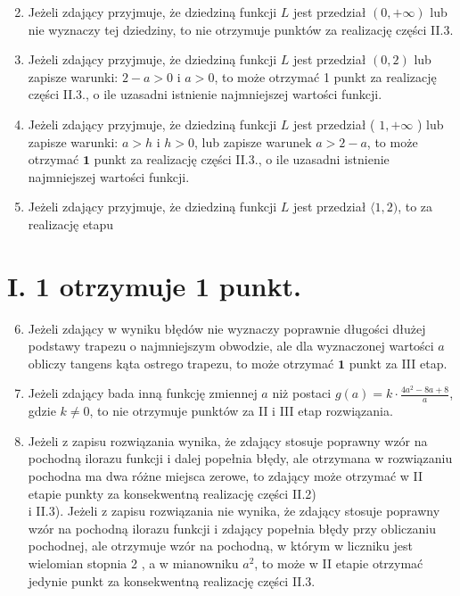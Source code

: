 \documentclass[10pt]{article}
\begin{document}
\begin{enumerate}
  \setcounter{enumi}{1}
  \item Jeżeli zdający przyjmuje, że dziedziną funkcji $L$ jest przedział $(0,+\infty)$ lub nie wyznaczy tej dziedziny, to nie otrzymuje punktów za realizację części II.3.
  \item Jeżeli zdający przyjmuje, że dziedziną funkcji $L$ jest przedział $(0,2)$ lub zapisze warunki: $2-a>0$ i $a>0$, to może otrzymać 1 punkt za realizację części II.3., o ile uzasadni istnienie najmniejszej wartości funkcji.
  \item Jeżeli zdający przyjmuje, że dziedziną funkcji $L$ jest przedział ( $1,+\infty$ ) lub zapisze warunki: $a>h$ i $h>0$, lub zapisze warunek $a>2-a$, to może otrzymać $\mathbf{1}$ punkt za realizację części II.3., o ile uzasadni istnienie najmniejszej wartości funkcji.
  \item Jeżeli zdający przyjmuje, że dziedziną funkcji $L$ jest przedział $\langle 1,2)$, to za realizację etapu
\end{enumerate}

\section*{I. 1 otrzymuje 1 punkt.}
\begin{enumerate}
  \setcounter{enumi}{5}
  \item Jeżeli zdający w wyniku błędów nie wyznaczy poprawnie długości dłużej podstawy trapezu o najmniejszym obwodzie, ale dla wyznaczonej wartości $a$ obliczy tangens kąta ostrego trapezu, to może otrzymać $\mathbf{1}$ punkt za III etap.
  \item Jeżeli zdający bada inną funkcję zmiennej $a$ niż postaci $g(a)=k \cdot \frac{4 a^{2}-8 a+8}{a}$, gdzie $k \neq 0$, to nie otrzymuje punktów za II i III etap rozwiązania.
  \item Jeżeli z zapisu rozwiązania wynika, że zdający stosuje poprawny wzór na pochodną ilorazu funkcji i dalej popełnia błędy, ale otrzymana w rozwiązaniu pochodna ma dwa różne miejsca zerowe, to zdający może otrzymać w II etapie punkty za konsekwentną realizację części II.2)\\
i II.3). Jeżeli z zapisu rozwiązania nie wynika, że zdający stosuje poprawny wzór na pochodną ilorazu funkcji i zdający popełnia błędy przy obliczaniu pochodnej, ale otrzymuje wzór na pochodną, w którym w liczniku jest wielomian stopnia 2 , a w mianowniku $a^{2}$, to może w II etapie otrzymać jedynie punkt za konsekwentną realizację części II.3.
\end{enumerate}
\end{document}
